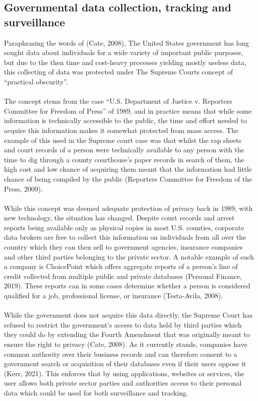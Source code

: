 \documentclass[11pt]{article}
\begin{document}
\subsection{Governmental data collection, tracking and surveillance}
Paraphrasing the words of (Cate, 2008), The United States government has long sought data about individuals for a wide variety of important public purposes, but due to the then time and cost-heavy processes yielding mostly useless data, this collecting of data was protected under The Supreme Courts concept of “practical obscurity”. 
\\ \\
The concept stems from the case “U.S. Department of Justice v. Reporters Committee for Freedom of Press” of 1989, and in practice means that while some information is technically accessible to the public, the time and effort needed to acquire this information makes it somewhat protected from mass access. The example of this used in the Supreme court case was that whilst the rap sheets and court records of a person were technically available to any person with the time to dig through a county courthouse’s paper records in search of them, the high cost and low chance of acquiring them meant that the information had little chance of being compiled by the public (Reporters Committee for Freedom of the Press, 2009). 
\\ \\
While this concept was deemed adequate protection of privacy back in 1989, with new technology, the situation has changed. Despite court records and arrest reports being available only as physical copies in most U.S. counties, corporate data brokers are free to collect this information on individuals from all over the country which they can then sell to government agencies, insurance companies and other third parties belonging to the private sector. A notable example of such a company is ChoicePoint which offers aggregate reports of a person’s line of credit collected from multiple public and private databases (Personal Finance, 2019). These reports can in some cases determine whether a person is considered qualified for a job, professional license, or insurance (Testa-Avila, 2008).
\\ \\
While the government does not acquire this data directly, the Supreme Court has refused to restrict the government’s access to data held by third parties which they could do by extending the Fourth Amendment that was originally meant to ensure the right to privacy (Cate, 2008). As it currently stands, companies have common authority over their business records and can therefore consent to a government search or acquisition of their databases even if their users oppose it (Kerr, 2021).
This enforces that by using applications, websites or services, the user allows both private sector parties and authorities access to their personal data which could be used for both surveillance and tracking.
\\
\end{document}

